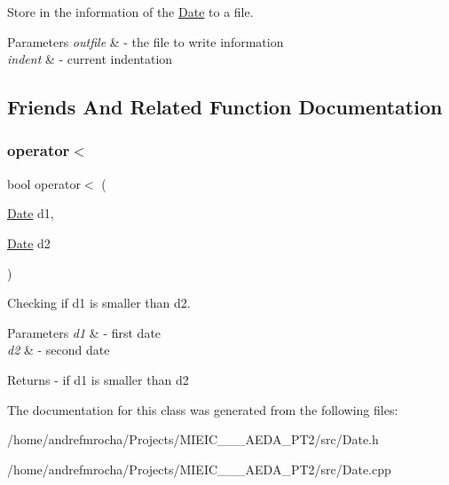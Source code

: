 Store in the information of the \mbox{\hyperlink{class_date}{Date}} to a file. 


\begin{DoxyParams}{Parameters}
{\em outfile} & -\/ the file to write information \\
\hline
{\em indent} & -\/ current indentation \\
\hline
\end{DoxyParams}


\subsection{Friends And Related Function Documentation}
\mbox{\label{class_date_ab238dfc73280d2b16266ebd3daf1b896}} 
\subsubsection{\texorpdfstring{operator$<$}{operator<}}
{\footnotesize\ttfamily bool operator$<$ (\begin{DoxyParamCaption}\item[{\mbox{\hyperlink{class_date}{Date}}}]{d1,  }\item[{\mbox{\hyperlink{class_date}{Date}}}]{d2 }\end{DoxyParamCaption})\hspace{0.3cm}{\ttfamily [friend]}}



Checking if d1 is smaller than d2. 


\begin{DoxyParams}{Parameters}
{\em d1} & -\/ first date \\
\hline
{\em d2} & -\/ second date \\
\hline
\end{DoxyParams}
\begin{DoxyReturn}{Returns}
-\/ if d1 is smaller than d2 
\end{DoxyReturn}


The documentation for this class was generated from the following files\+:\begin{DoxyCompactItemize}
\item 
/home/andrefmrocha/\+Projects/\+M\+I\+E\+I\+C\+\_\+\_\+\_\+\+A\+E\+D\+A\+\_\+\+P\+T2/src/Date.\+h\item 
/home/andrefmrocha/\+Projects/\+M\+I\+E\+I\+C\+\_\+\_\+\_\+\+A\+E\+D\+A\+\_\+\+P\+T2/src/Date.\+cpp\end{DoxyCompactItemize}
